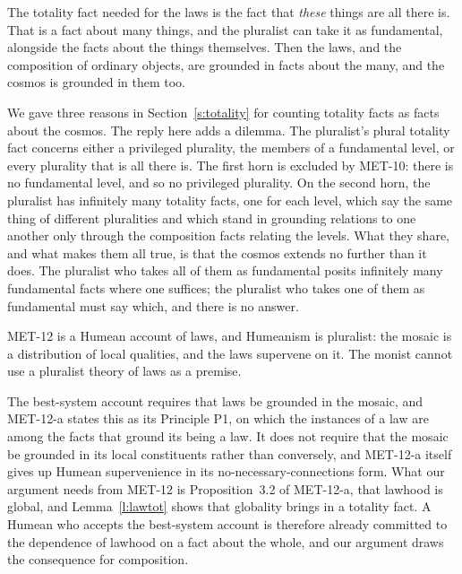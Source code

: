 \documentclass{situationist-preprint}
\begin{document}
\begin{objection}\label{o:plural}
The totality fact needed for the laws is the fact that \emph{these} things are all there is. That is a fact about many things, and the pluralist can take it as fundamental, alongside the facts about the things themselves. Then the laws, and the composition of ordinary objects, are grounded in facts about the many, and the cosmos is grounded in them too.
\end{objection}

\begin{reply}
We gave three reasons in Section~\ref{s:totality} for counting totality facts as facts about the cosmos. The reply here adds a dilemma. The pluralist's plural totality fact concerns either a privileged plurality, the members of a fundamental level, or every plurality that is all there is. The first horn is excluded by MET-10: there is no fundamental level, and so no privileged plurality. On the second horn, the pluralist has infinitely many totality facts, one for each level, which say the same thing of different pluralities and which stand in grounding relations to one another only through the composition facts relating the levels. What they share, and what makes them all true, is that the cosmos extends no further than it does. The pluralist who takes all of them as fundamental posits infinitely many fundamental facts where one suffices; the pluralist who takes one of them as fundamental must say which, and there is no answer.
\end{reply}

\begin{objection}\label{o:mosaic}
MET-12 is a Humean account of laws, and Humeanism is pluralist: the mosaic is a distribution of local qualities, and the laws supervene on it. The monist cannot use a pluralist theory of laws as a premise.
\end{objection}

\begin{reply}
The best-system account requires that laws be grounded in the mosaic, and MET-12-a states this as its Principle P1, on which the instances of a law are among the facts that ground its being a law. It does not require that the mosaic be grounded in its local constituents rather than conversely, and MET-12-a itself gives up Humean supervenience in its no-necessary-connections form. What our argument needs from MET-12 is Proposition~3.2 of MET-12-a, that lawhood is global, and Lemma~\ref{l:lawtot} shows that globality brings in a totality fact. A Humean who accepts the best-system account is therefore already committed to the dependence of lawhood on a fact about the whole, and our argument draws the consequence for composition.
\end{reply}
\end{document}
